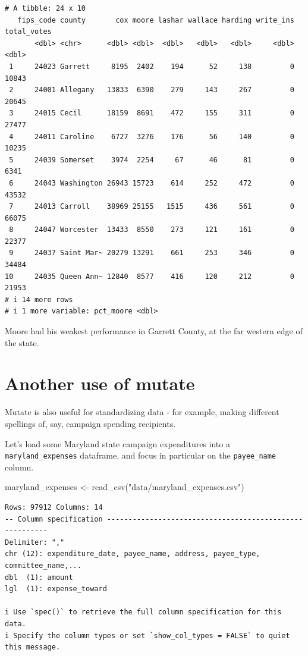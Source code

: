 \documentclass[
  letterpaper,
  DIV=11,
  numbers=noendperiod]{scrreprt}
\newenvironment{Shaded}{\begin{snugshade}}{\end{snugshade}}
\newcommand{\FunctionTok}[1]{\textcolor[rgb]{0.28,0.35,0.67}{#1}}
\newcommand{\NormalTok}[1]{\textcolor[rgb]{0.00,0.23,0.31}{#1}}
\newcommand{\OtherTok}[1]{\textcolor[rgb]{0.00,0.23,0.31}{#1}}
\newcommand{\StringTok}[1]{\textcolor[rgb]{0.13,0.47,0.30}{#1}}
\begin{document}
\begin{verbatim}
# A tibble: 24 x 10
   fips_code county       cox moore lashar wallace harding write_ins total_votes
       <dbl> <chr>      <dbl> <dbl>  <dbl>   <dbl>   <dbl>     <dbl>       <dbl>
 1     24023 Garrett     8195  2402    194      52     138         0       10843
 2     24001 Allegany   13833  6390    279     143     267         0       20645
 3     24015 Cecil      18159  8691    472     155     311         0       27477
 4     24011 Caroline    6727  3276    176      56     140         0       10235
 5     24039 Somerset    3974  2254     67      46      81         0        6341
 6     24043 Washington 26943 15723    614     252     472         0       43532
 7     24013 Carroll    38969 25155   1515     436     561         0       66075
 8     24047 Worcester  13433  8550    273     121     161         0       22377
 9     24037 Saint Mar~ 20279 13291    661     253     346         0       34484
10     24035 Queen Ann~ 12840  8577    416     120     212         0       21953
# i 14 more rows
# i 1 more variable: pct_moore <dbl>
\end{verbatim}

Moore had his weakest performance in Garrett County, at the far western
edge of the state.

\hypertarget{another-use-of-mutate}{%
\section{Another use of mutate}\label{another-use-of-mutate}}

Mutate is also useful for standardizing data - for example, making
different spellings of, say, campaign spending recipients.

Let's load some Maryland state campaign expenditures into a
\texttt{maryland\_expenses} dataframe, and focus in particular on the
\texttt{payee\_name} column.

\begin{Shaded}
\begin{Highlighting}[]
\NormalTok{maryland\_expenses }\OtherTok{\textless{}{-}} \FunctionTok{read\_csv}\NormalTok{(}\StringTok{"data/maryland\_expenses.csv"}\NormalTok{)}
\end{Highlighting}
\end{Shaded}

\begin{verbatim}
Rows: 97912 Columns: 14
-- Column specification --------------------------------------------------------
Delimiter: ","
chr (12): expenditure_date, payee_name, address, payee_type, committee_name,...
dbl  (1): amount
lgl  (1): expense_toward

i Use `spec()` to retrieve the full column specification for this data.
i Specify the column types or set `show_col_types = FALSE` to quiet this message.
\end{verbatim}
\end{document}
